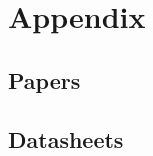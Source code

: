 \appendix
	
\section{Appendix} 
	\subsection{Papers}
	
	\subsection{Datasheets} \label{sec:appendix}
	

